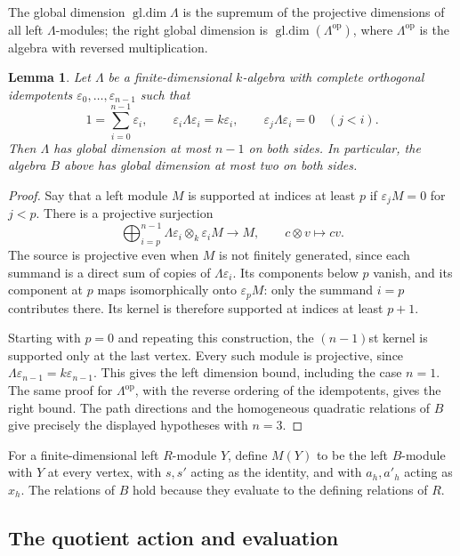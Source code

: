 \documentclass[11pt]{article}
\numberwithin{equation}{section}
\newtheorem{lemma}[theorem]{Lemma}
\theoremstyle{definition}
\theoremstyle{remark}
\DeclareMathOperator{\gldim}{gl.dim}
\begin{document}
The global dimension $\gldim\Lambda$ is the supremum of the
projective dimensions of all left $\Lambda$-modules; the right global
dimension is $\gldim(\Lambda^{\mathrm{op}})$, where
$\Lambda^{\mathrm{op}}$ is the algebra with reversed multiplication.

\begin{lemma}\label{lem:directed-bound}
Let $\Lambda$ be a finite-dimensional $k$-algebra with complete
orthogonal idempotents $\varepsilon_0,\ldots,\varepsilon_{n-1}$ such that
\[
  1=\sum_{i=0}^{n-1}\varepsilon_i,\qquad
  \varepsilon_i\Lambda\varepsilon_i=k\varepsilon_i,\qquad
  \varepsilon_j\Lambda\varepsilon_i=0\quad(j<i).
\]
Then $\Lambda$ has global dimension at most $n-1$ on both sides.
In particular, the algebra $B$ above has global dimension at most two
on both sides.
\end{lemma}

\begin{proof}
Say that a left module $M$ is supported at indices at least $p$ if
$\varepsilon_jM=0$ for $j<p$.  There is a projective surjection
\[
  \bigoplus_{i=p}^{n-1}
      \Lambda\varepsilon_i\otimes_k\varepsilon_iM
      \longrightarrow M,
  \qquad c\otimes v\longmapsto cv.
\]
The source is projective even when $M$ is not finitely generated,
since each summand is a direct sum of copies of
$\Lambda\varepsilon_i$.  Its components below $p$ vanish, and its
component at $p$ maps isomorphically onto $\varepsilon_pM$:
only the summand $i=p$ contributes there.  Its kernel is therefore
supported at indices at least $p+1$.

Starting with $p=0$ and repeating this construction, the
$(n-1)$st kernel is supported only at the last vertex.  Every such
module is projective, since
$\Lambda\varepsilon_{n-1}=k\varepsilon_{n-1}$.
This gives the left dimension bound, including the case $n=1$.
The same proof for $\Lambda^{\mathrm{op}}$, with the reverse ordering
of the idempotents, gives the right bound.  The path directions and
the homogeneous quadratic relations of $B$ give precisely the
displayed hypotheses with $n=3$.
\end{proof}

For a finite-dimensional left $R$-module $Y$, define $M(Y)$ to be the
left $B$-module with $Y$ at every vertex, with $s,s'$ acting as the
identity, and with $a_h,a'_h$ acting as $x_h$.  The relations of $B$
hold because they evaluate to the defining relations of $R$.

\subsection{The quotient action and evaluation}
\end{document}
